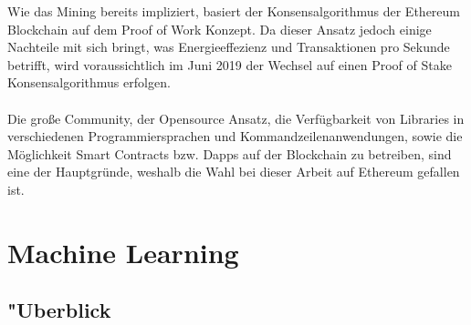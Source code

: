 Wie das Mining bereits impliziert, basiert der Konsensalgorithmus der Ethereum Blockchain auf dem Proof of Work Konzept. Da dieser Ansatz jedoch einige Nachteile mit sich bringt, was Energieeffezienz und Transaktionen pro Sekunde betrifft, wird voraussichtlich im Juni 2019 der Wechsel auf einen Proof of Stake Konsensalgorithmus erfolgen. \\\\
Die große Community, der Opensource Ansatz, die Verfügbarkeit von Libraries in verschiedenen Programmiersprachen und Kommandzeilenanwendungen, sowie die Möglichkeit Smart Contracts bzw. Dapps auf der Blockchain zu betreiben, sind eine der Hauptgründe, weshalb die Wahl bei dieser Arbeit auf Ethereum gefallen ist.   
\cite{BitcoinEthNCo,DL:bafin,Antonopoulos:2017:MBP:3164842}


\section{Machine Learning}
\subsection{"Uberblick}

